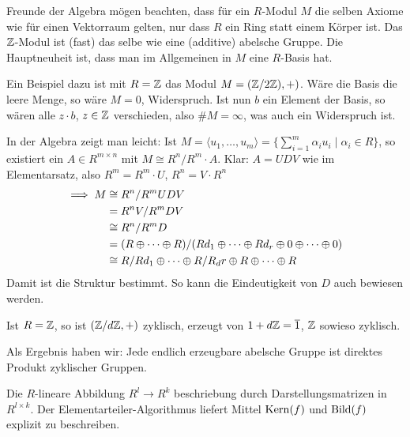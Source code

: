 \documentclass[a4paper,DIV15,BCOR12mm]{article}
\begin{document}
Freunde der Algebra mögen beachten, dass für ein $R$-Modul $M$ die selben Axiome wie für einen Vektorraum gelten, nur dass $R$ ein Ring statt einem Körper ist. Das $\mathbb{Z}$-Modul ist (fast) das selbe wie eine (additive) abelsche Gruppe. Die Hauptneuheit ist, dass man im Allgemeinen in $M$ eine $R$-Basis hat.

Ein Beispiel dazu ist mit $R=\mathbb{Z}$ das Modul $M=(\mathbb{Z}/2\mathbb{Z}),+)$. Wäre die Basis die leere Menge, so wäre $M=0$, Widerspruch. Ist nun $b$ ein Element der Basis, so wären alle $z\cdot b$, $z\in\mathbb{Z}$ verschieden, also $\#M = \infty$, was auch ein Widerspruch ist.

In der Algebra zeigt man leicht: Ist $M = \langle u_1, \ldots, u_m \rangle = \{ \sum_{i=1}^m \alpha_i u_i \mid \alpha _i \in R \}$, so existiert ein $A\in R^{m\times n}$ mit $M \cong R^n/R^m\cdot A$. Klar: $A=UDV$ wie im Elementarsatz, also $R^m = R^m\cdot U$, $R^n=V\cdot R^n$
\begin{align*}
\implies M&\cong R^n/R^mUDV \\
&= R^nV/R^mDV \\
&\cong R^n/R^mD \\
&= (R\oplus \cdots \oplus R) / (Rd_1 \oplus \cdots \oplus Rd_r \oplus 0 \oplus \cdots \oplus 0) \\
&\cong R/Rd_1 \oplus \cdots \oplus R/R_dr \oplus R \oplus \cdots \oplus R
\end{align*}
Damit ist die Struktur bestimmt. So kann die Eindeutigkeit von $D$ auch bewiesen werden.

Ist $R=\mathbb{Z}$, so ist $(\mathbb{Z}/d\mathbb{Z},+)$ zyklisch, erzeugt von $1+d\mathbb{Z}=\overline 1$, $\mathbb{Z}$ sowieso zyklisch.

Als Ergebnis haben wir: Jede endlich erzeugbare abelsche Gruppe ist direktes Produkt zyklischer Gruppen.

Die $R$-lineare Abbildung $R^l \to R^k$ beschriebung durch Darstellungsmatrizen in $R^{l\times k}$. Der Elementarteiler-Algorithmus liefert Mittel $\mathop{\rm Kern}\nolimits(f)$ und $\mathop{\rm Bild}\nolimits(f)$ explizit zu beschreiben.
\end{document}
